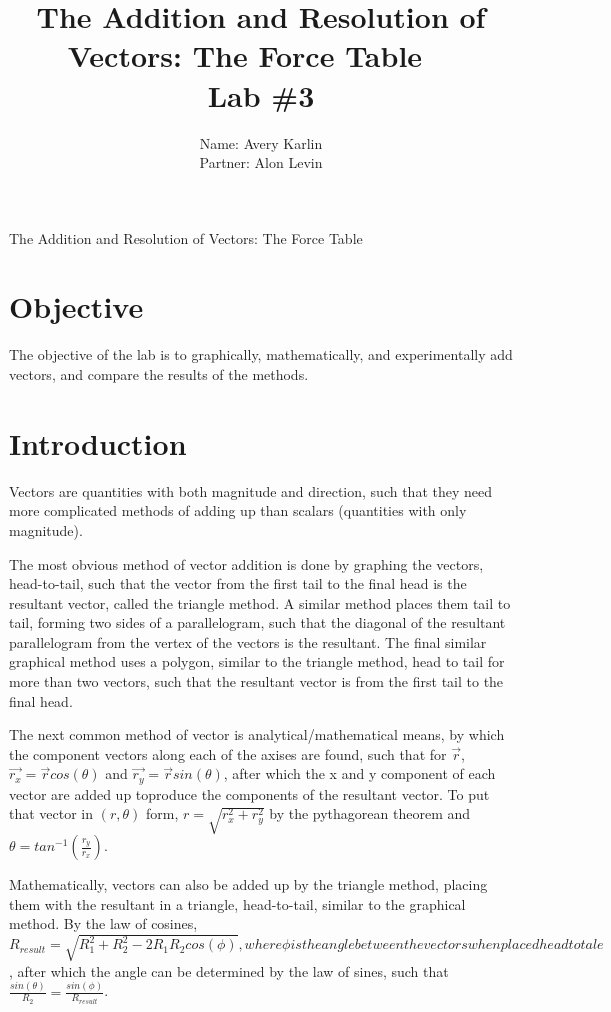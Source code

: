 \documentclass[11pt, titlepage]{article}
\title{The Addition and Resolution of Vectors: The Force Table\ \ \\ \large Lab \#3}
\author{Name: Avery Karlin \\ Partner: Alon Levin}
\date{}
\begin{document}
\maketitle

\begin{center}
\LARGE The Addition and Resolution of Vectors: The Force Table
\end{center}

\section*{Objective}
The objective of the lab is to graphically, mathematically, and experimentally add vectors, and compare the results of the methods.
\section*{Introduction}
Vectors are quantities with both magnitude and direction, such that they need more complicated methods of adding up than scalars (quantities with only magnitude).

The most obvious method of vector addition is done by graphing the vectors, head-to-tail, such that the vector from the first tail to the final head is the resultant vector, called the triangle method. A similar method places them tail to tail, forming two sides of a parallelogram, such that the diagonal of the resultant parallelogram from the vertex of the vectors is the resultant. The final similar graphical method uses a polygon, similar to the triangle method, head to tail for more than two vectors, such that the resultant vector is from the first tail to the final head.

The next common method of vector is analytical/mathematical means, by which the component vectors along each of the axises are found, such that for $\vec{r}$, $\vec{r_x} = \vec{r}cos(\theta)$ and $\vec{r_y} = \vec{r}sin(\theta)$, after which the x and y component of each vector are added up toproduce the components of the resultant vector. To put that vector in $(r, \theta)$ form, $r = \sqrt{r_x^2 + r_y^2}$ by the pythagorean theorem and $\theta = tan^{-1}(\frac{r_y}{r_x})$.

Mathematically, vectors can also be added up by the triangle method, placing them with the resultant in a triangle, head-to-tail, similar to the graphical method. By the law of cosines, $R_{result} = \sqrt{R_1^2 + R_2^2 - 2R_1R_2cos(\phi)}, where \phi is the angle between the vectors when placed head to tale$, after which the angle can be determined by the law of sines, such that $\frac{sin(\theta)}{R_2} = \frac{sin(\phi)}{R_{result}}$.
\end{document}
